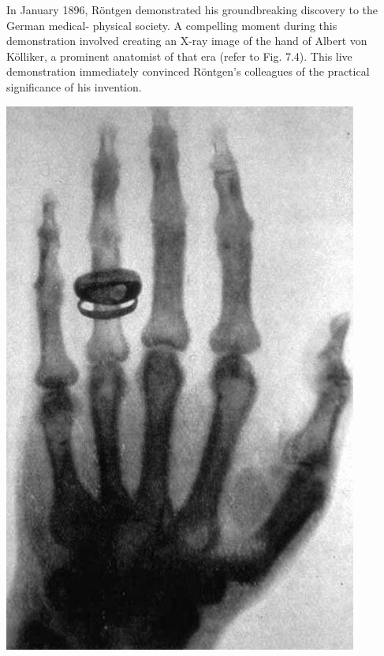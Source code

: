 \documentclass[a4paper,12pt]{report}
\begin{document}
In January 1896, Röntgen demonstrated his groundbreaking discovery to the German medical-
physical society. A compelling moment during this demonstration involved creating an X-ray
image of the hand of Albert von Kölliker, a prominent anatomist of that era (refer to Fig. 7.4).
This live demonstration immediately convinced Röntgen's colleagues of the practical significance
of his invention.

\begin{center}
  \includegraphics[scale= 0.4]{KollikerHand.jpg}
  \label{KollikerHand}
\end{center}
\end{document}
